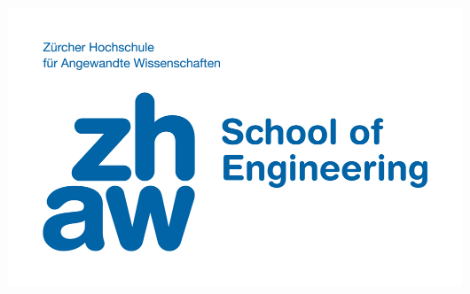 \documentclass[a4paper,11pt]{article}
\title{
  \includegraphics[width=12cm]{images/zhaw-big}\\[\bigskipamount]
  \documenttitle\\[\bigskipamount]
}
\author{\documentauthors}
\date{\parbox{\linewidth}{\centering%
  Date \documentdate\endgraf
}}
\begin{document}
\maketitle\thispagestyle{empty}\newpage

\begin{abstract}
  
          \newpage
\end{abstract}









\end{document}
